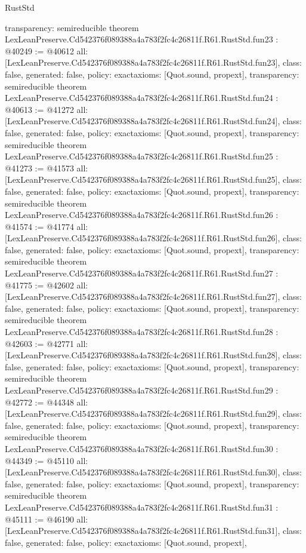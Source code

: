 \begin{lexlean}{RustStd}
\begin{coremodule}
{  transparency: semireducible
}
theorem LexLeanPreserve.Cd542376f089388a4a783f2fc4c26811f.R61.RustStd.fun23 : @40249 := @40612 {
  all: [LexLeanPreserve.Cd542376f089388a4a783f2fc4c26811f.R61.RustStd.fun23],
  class: false,
  generated: false,
  policy: exact{axioms: [Quot.sound, propext]},
  transparency: semireducible
}
theorem LexLeanPreserve.Cd542376f089388a4a783f2fc4c26811f.R61.RustStd.fun24 : @40613 := @41272 {
  all: [LexLeanPreserve.Cd542376f089388a4a783f2fc4c26811f.R61.RustStd.fun24],
  class: false,
  generated: false,
  policy: exact{axioms: [Quot.sound, propext]},
  transparency: semireducible
}
theorem LexLeanPreserve.Cd542376f089388a4a783f2fc4c26811f.R61.RustStd.fun25 : @41273 := @41573 {
  all: [LexLeanPreserve.Cd542376f089388a4a783f2fc4c26811f.R61.RustStd.fun25],
  class: false,
  generated: false,
  policy: exact{axioms: [Quot.sound, propext]},
  transparency: semireducible
}
theorem LexLeanPreserve.Cd542376f089388a4a783f2fc4c26811f.R61.RustStd.fun26 : @41574 := @41774 {
  all: [LexLeanPreserve.Cd542376f089388a4a783f2fc4c26811f.R61.RustStd.fun26],
  class: false,
  generated: false,
  policy: exact{axioms: [Quot.sound, propext]},
  transparency: semireducible
}
theorem LexLeanPreserve.Cd542376f089388a4a783f2fc4c26811f.R61.RustStd.fun27 : @41775 := @42602 {
  all: [LexLeanPreserve.Cd542376f089388a4a783f2fc4c26811f.R61.RustStd.fun27],
  class: false,
  generated: false,
  policy: exact{axioms: [Quot.sound, propext]},
  transparency: semireducible
}
theorem LexLeanPreserve.Cd542376f089388a4a783f2fc4c26811f.R61.RustStd.fun28 : @42603 := @42771 {
  all: [LexLeanPreserve.Cd542376f089388a4a783f2fc4c26811f.R61.RustStd.fun28],
  class: false,
  generated: false,
  policy: exact{axioms: [Quot.sound, propext]},
  transparency: semireducible
}
theorem LexLeanPreserve.Cd542376f089388a4a783f2fc4c26811f.R61.RustStd.fun29 : @42772 := @44348 {
  all: [LexLeanPreserve.Cd542376f089388a4a783f2fc4c26811f.R61.RustStd.fun29],
  class: false,
  generated: false,
  policy: exact{axioms: [Quot.sound, propext]},
  transparency: semireducible
}
theorem LexLeanPreserve.Cd542376f089388a4a783f2fc4c26811f.R61.RustStd.fun30 : @44349 := @45110 {
  all: [LexLeanPreserve.Cd542376f089388a4a783f2fc4c26811f.R61.RustStd.fun30],
  class: false,
  generated: false,
  policy: exact{axioms: [Quot.sound, propext]},
  transparency: semireducible
}
theorem LexLeanPreserve.Cd542376f089388a4a783f2fc4c26811f.R61.RustStd.fun31 : @45111 := @46190 {
  all: [LexLeanPreserve.Cd542376f089388a4a783f2fc4c26811f.R61.RustStd.fun31],
  class: false,
  generated: false,
  policy: exact{axioms: [Quot.sound, propext]},
}
\end{coremodule}
\end{lexlean}
